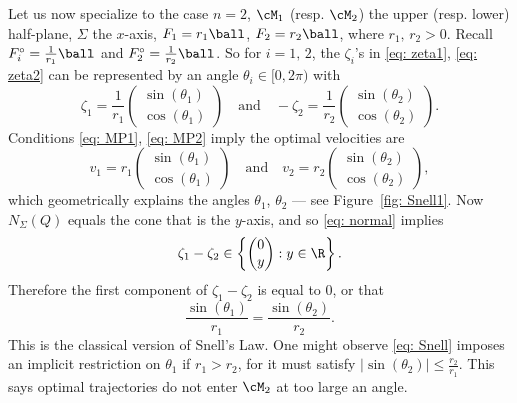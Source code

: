 \documentclass[12pt]{article}
\begin{document}
\begin{Exam}\label{Snell's Law}{\rm
Let us now specialize to the case $n=2$, $\cM_1$ (resp. $\cM_2$) the upper (resp. lower) half-plane, $\Sigma$ the $x$-axis, $F_1=r_1\ball$, $F_2=r_2\ball$, where $r_1,\,r_2>0$.  Recall $F_i^{\circ}=\frac{1}{r_1}\ball$ and $F_2^{\circ}=\frac{1}{r_2}\ball$.  So for $i=1,\,2$, the $\zeta_i$'s in \eqref{eq: zeta1}, \eqref{eq: zeta2} can be represented by an angle $\theta_i\in[0,2\pi)$ with
\[
\zeta_1=\frac{1}{r_1}\begin{pmatrix}\sin(\theta_1)\\ \cos(\theta_1)\end{pmatrix}
\quad \text{and}\quad 
-\zeta_2=\frac{1}{r_2}\begin{pmatrix}\sin(\theta_2) \\ \cos(\theta_2)\end{pmatrix}.
\]
Conditions \eqref{eq: MP1}, \eqref{eq: MP2} imply the optimal velocities are
\[
v_1=r_1\begin{pmatrix}\sin(\theta_1) \\ \cos(\theta_1)\end{pmatrix}
\quad\text{and}\quad
v_2=r_2\begin{pmatrix}\sin(\theta_2) \\ \cos(\theta_2)\end{pmatrix},
\]
which geometrically explains the angles $\theta_1$, $\theta_2$ --- see Figure~\ref{fig: Snell1}.  Now $N_{\Sigma}(Q)$ equals the cone that is the $y$-axis, and so \eqref{eq: normal} implies
\[
\zeta_1-\zeta_2\in\left\{\begin{pmatrix}0 \\ y\end{pmatrix}:y\in \R\right\}.
\]
Therefore the first component of $\zeta_1-\zeta_2$ is equal to $0$, or that
\begin{equation}\label{eq: Snell}
\frac{\sin(\theta_1)}{r_1} = \frac{\sin(\theta_2)}{r_2}.
\end{equation}
This is the classical version of Snell's Law.  One might observe \eqref{eq: Snell} imposes an implicit restriction on $\theta_1$ if $r_1>r_2$, for it must satisfy $\bigl|\sin(\theta_2)\bigr|\leq \frac{r_2}{r_1}$.  This says optimal trajectories do not enter $\cM_2$ at too large an angle.\hfill{\eop}}
\end{Exam}
\end{document}
